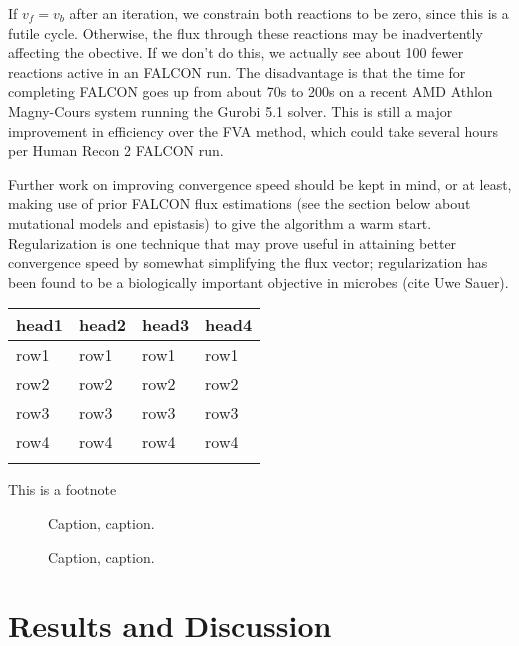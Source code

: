 \begin{methods}
If $v_f = v_b$ after an iteration, we constrain both reactions to be zero, since this
is a futile cycle. Otherwise, the flux through these reactions may be inadvertently affecting
the obective. If we don't do this, we actually see about 100 fewer reactions active in an FALCON run.
The disadvantage is that the time for completing FALCON goes up from about 70s to 200s on a recent
AMD Athlon Magny-Cours system running the Gurobi 5.1 solver. This is still a major improvement 
in efficiency over the FVA method, which could take several hours per Human Recon 2 FALCON run.

Further work on improving convergence speed should be kept in mind, or
at least, making use of prior FALCON flux estimations (see the section
below about mutational models and epistasis) to give the algorithm a
warm start.  Regularization is one technique that may prove useful in
attaining better convergence speed by somewhat simplifying the flux
vector; regularization has been found to be a biologically important
objective in microbes (cite Uwe Sauer).


\begin{table}[!t]
{\begin{tabular}{llll}\toprule
head1 & head2 & head3 & head4\\\midrule
row1 & row1 & row1 & row1\\
row2 & row2 & row2 & row2\\
row3 & row3 & row3 & row3\\
row4 & row4 & row4 & row4\\\botrule
\end{tabular}}{This is a footnote}
\end{table}

\end{methods}

\begin{figure}[!tpb]%
\caption{Caption, caption.}\label{fig:01}
\end{figure}

\begin{figure}[!tpb]%
\caption{Caption, caption.}\label{fig:02}
\end{figure}

\section{Results and Discussion}


